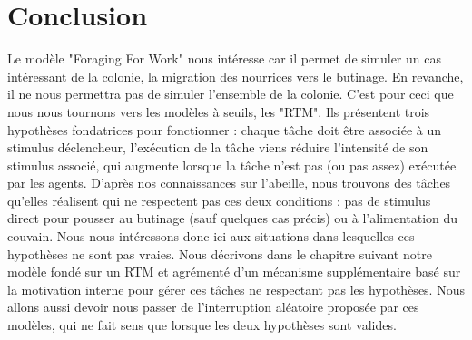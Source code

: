 			
	\section*{Conclusion}
	Le modèle "Foraging For Work" nous intéresse car il permet de simuler un cas intéressant de la colonie, la migration des nourrices vers le butinage. En revanche, il ne nous permettra pas de simuler l'ensemble de la colonie. C'est pour ceci que nous nous tournons vers les modèles à seuils, les "RTM". Ils présentent trois hypothèses fondatrices pour fonctionner : chaque tâche doit être associée à un stimulus déclencheur, l'exécution de la tâche viens réduire l'intensité de son stimulus associé, qui augmente lorsque la tâche n'est pas (ou pas assez) exécutée par les agents.
	D'après nos connaissances sur l'abeille, nous trouvons des tâches qu'elles réalisent qui ne respectent pas ces deux conditions : pas de stimulus direct pour pousser au butinage (sauf quelques cas précis) ou à l'alimentation du couvain. Nous nous intéressons donc ici aux situations dans lesquelles ces hypothèses ne sont pas vraies. Nous décrivons dans le chapitre suivant notre modèle fondé sur un RTM et agrémenté d'un mécanisme supplémentaire basé sur la motivation interne pour gérer ces tâches ne respectant pas les hypothèses. Nous allons aussi devoir nous passer de l'interruption aléatoire proposée par ces modèles, qui ne fait sens que lorsque les deux hypothèses sont valides.
